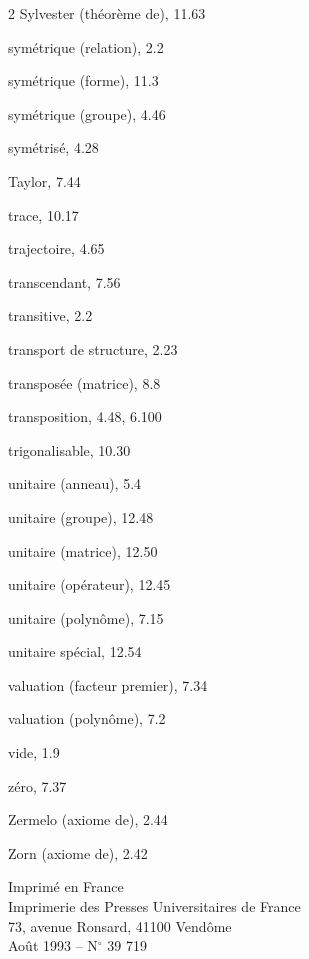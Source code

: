 \begin{multicols}{2}
Sylvester (théorème de), 11.63

symétrique (relation), 2.2

symétrique (forme), 11.3

symétrique (groupe), 4.46

symétrisé, 4.28

\medskip
Taylor, 7.44

trace, 10.17

trajectoire, 4.65

transcendant, 7.56

transitive, 2.2

transport de structure, 2.23

transposée (matrice), 8.8

transposition, 4.48, 6.100

trigonalisable, 10.30

\medskip
unitaire (anneau), 5.4

unitaire (groupe), 12.48

unitaire (matrice), 12.50

unitaire (opérateur), 12.45

unitaire (polynôme), 7.15

unitaire spécial, 12.54

\medskip
valuation (facteur premier), 7.34

valuation (polynôme), 7.2


vide, 1.9

\medskip
zéro, 7.37

Zermelo (axiome de), 2.44

Zorn (axiome de), 2.42

\end{multicols}

\vfill
\begin{center}
\footnotesize\sffamily\color{BellaGray}
Imprimé en France\\
Imprimerie des Presses Universitaires de France\\
73, avenue Ronsard, 41100 Vendôme\\
Août 1993 -- N$^{\circ}$ 39 719
\end{center}
\endgroup
